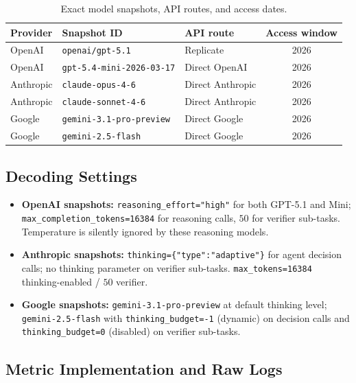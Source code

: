 \documentclass{article}
\begin{document}
\begin{table}[h]
\centering
\caption{Exact model snapshots, API routes, and access dates.}
\label{tab:repro-snapshots}
\small
\begin{tabular}{lllc}
\toprule
Provider & Snapshot ID & API route & Access window \\
\midrule
OpenAI    & \texttt{openai/gpt-5.1} & Replicate & 2026 \\
OpenAI    & \texttt{gpt-5.4-mini-2026-03-17} & Direct OpenAI & 2026 \\
Anthropic & \texttt{claude-opus-4-6} & Direct Anthropic & 2026 \\
Anthropic & \texttt{claude-sonnet-4-6} & Direct Anthropic & 2026 \\
Google    & \texttt{gemini-3.1-pro-preview} & Direct Google & 2026 \\
Google    & \texttt{gemini-2.5-flash} & Direct Google & 2026 \\
\bottomrule
\end{tabular}
\end{table}

\subsection{Decoding Settings}

\begin{itemize}[leftmargin=*, itemsep=1pt, topsep=2pt]
  \item \textbf{OpenAI snapshots:} \texttt{reasoning\_effort="high"} for both GPT-5.1 and Mini; \texttt{max\_completion\_tokens=16384} for reasoning calls, $50$ for verifier sub-tasks. Temperature is silently ignored by these reasoning models.
  \item \textbf{Anthropic snapshots:} \texttt{thinking=\{"type":"adaptive"\}} for agent decision calls; no thinking parameter on verifier sub-tasks. \texttt{max\_tokens=16384} thinking-enabled / $50$ verifier.
  \item \textbf{Google snapshots:} \texttt{gemini-3.1-pro-preview} at default thinking level; \texttt{gemini-2.5-flash} with \texttt{thinking\_budget=-1} (dynamic) on decision calls and \texttt{thinking\_budget=0} (disabled) on verifier sub-tasks.
\end{itemize}

\subsection{Metric Implementation and Raw Logs}
\end{document}
